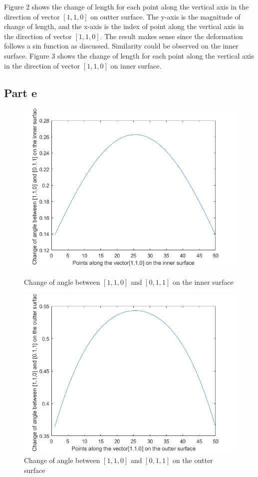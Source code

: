 \documentclass[a4paper,12pt]{article} %
\begin{document}
Figure 2 shows the change of length for each point along the vertical axis in the direction of vector $[1,1,0]$ on outter surface.
The y-axis is the magnitude of change of length, and the x-axis is the index of point along the vertical axis in the direction of vector $[1,1,0]$.
The result makes sense since the deformation follows a sin function as discussed. Similarity could be observed on the inner surface.
Figure 3 shows the change of length for each point along the vertical axis in the direction of vector $[1,1,0]$ on inner surface.

\subsection{Part e}
\begin{figure}[H]
    \includegraphics[scale=0.7]{MECH503HW1Q5_4.png}
    \caption{Change of angle between $[1,1,0]$ and $[0,1,1]$ on the inner surface}
     
    \includegraphics[scale=0.7]{MECH503HW1Q5_5.png}
    \caption{Change of angle between $[1,1,0]$ and $[0,1,1]$ on the outter surface}
\label{figure2}
\end{figure}
\end{document}
